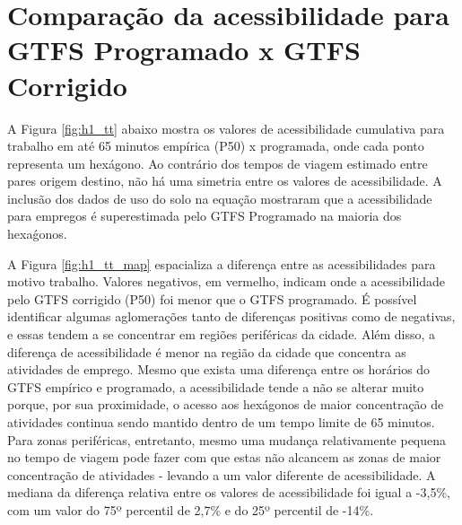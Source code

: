 \documentclass[        
    a4paper,          %
    12pt,             %
    chapter=TITLE,    %
    section=Title,    %
    subsection=Title, %
    oneside,          %
    english,          %
    spanish,          %
    brazil,           %
    fleqn             %
]{abntex2}
\begin{document}
  \hypertarget{comparacao-da-acessibilidade-para-gtfs-programado-x-gtfs-corrigido}{%
  \section{Comparação da acessibilidade para GTFS Programado x GTFS Corrigido}\label{comparacao-da-acessibilidade-para-gtfs-programado-x-gtfs-corrigido}}
  
  A Figura \ref{fig:h1_tt} abaixo mostra os valores de acessibilidade cumulativa para trabalho em até 65 minutos empírica (P50) x programada, onde cada ponto representa um hexágono. Ao contrário dos tempos de viagem estimado entre pares origem destino, não há uma simetria entre os valores de acessibilidade. A inclusão dos dados de uso do solo na equação mostraram que a acessibilidade para empregos é superestimada pelo GTFS Programado na maioria dos hexaǵonos.
  
  \begin{figure}[!h]
  \captionsetup{width=16cm}
  \centering
  \end{figure}
  
  A Figura \ref{fig:h1_tt_map} espacializa a diferença entre as acessibilidades para motivo trabalho. Valores negativos, em vermelho, indicam onde a acessibilidade pelo GTFS corrigido (P50) foi menor que o GTFS programado. É possível identificar algumas aglomerações tanto de diferenças positivas como de negativas, e essas tendem a se concentrar em regiões periféricas da cidade. Além disso, a diferença de acessibilidade é menor na região da cidade que concentra as atividades de emprego. Mesmo que exista uma diferença entre os horários do GTFS empírico e programado, a acessibilidade tende a não se alterar muito porque, por sua proximidade, o acesso aos hexágonos de maior concentração de atividades continua sendo mantido dentro de um tempo limite de 65 minutos. Para zonas periféricas, entretanto, mesmo uma mudança relativamente pequena no tempo de viagem pode fazer com que estas não alcancem as zonas de maior concentração de atividades - levando a um valor diferente de acessibilidade. A mediana da diferença relativa entre os valores de acessibilidade foi igual a -3,5\%, com um valor do 75º percentil de 2,7\% e do 25º percentil de -14\%.
  
\end{document}
